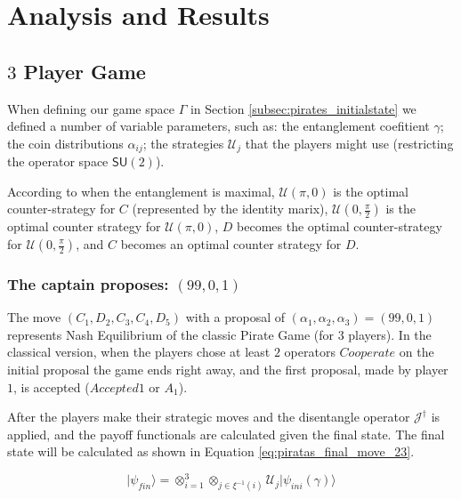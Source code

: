 \section{Analysis and Results}
\label{sec:description_3}


\subsection{$3$ Player Game}
\label{subsec:3playergame}


When defining our game space $\Gamma$ in Section \ref{subsec:pirates_initialstate} we defined a number of variable parameters, such as: the entanglement coefitient $\gamma$; the coin distributions $\alpha_{ij}$; the strategies $\mathcal{U}_{j}$ that the players might use (restricting the operator space $\mathsf{SU}(2)$). 

According to \cite{Du} when the entanglement is maximal, $\mathcal{U}(\pi, 0)$ is the optimal counter-strategy for $C$ (represented by the identity marix), $\mathcal{U}(0, \frac{\pi}{2})$ is the optimal counter strategy for $\mathcal{U}(\pi, 0)$, $D$ becomes the optimal counter-strategy for $\mathcal{U}(0, \frac{\pi}{2})$, and $C$ becomes an optimal counter strategy for $D$.


\subsubsection{The captain proposes: $(99, 0, 1)$}
\label{subsubsec:3playergame99}

The move $(C_1,D_2,C_3,C_4,D_5)$ with a proposal of $(\alpha_{1}, \alpha_{2}, \alpha_{3}) =(99, 0, 1)$ represents Nash Equilibrium of the classic Pirate Game (for $3$ players). In the classical version, when the players chose at least $2$ operators $Cooperate$ on the initial proposal the game ends right away, and the first proposal, made by player $1$, is accepted ($Accepted 1$ or $A_{1}$).

After the players make their strategic moves and the disentangle operator $\mathcal{J}^{\dagger}$ is applied, and the payoff functionals are calculated given the final state. The final state will be calculated as shown in Equation \ref{eq:piratas_final_move_23}.

\begin{equation}
\vert\psi_{fin}\rangle=\otimes_{i=1}^{3}\otimes_{j\in\xi^{-1}(i)}\mathcal{U}_{j}\vert\psi_{ini}(\gamma)\rangle
\label{eq:piratas_final_move_23}
\end{equation} 

